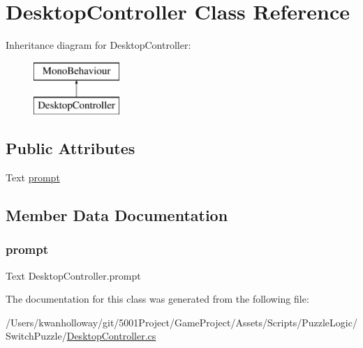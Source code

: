 \hypertarget{class_desktop_controller}{}\section{Desktop\+Controller Class Reference}
\label{class_desktop_controller}
Inheritance diagram for Desktop\+Controller\+:\begin{figure}[H]
\begin{center}
\leavevmode
\includegraphics[height=2.000000cm]{class_desktop_controller}
\end{center}
\end{figure}
\subsection*{Public Attributes}
\begin{DoxyCompactItemize}
\item 
Text \hyperlink{class_desktop_controller_a838c18cc5a44e5fb6e1489a390b2c8dd}{prompt}
\end{DoxyCompactItemize}


\subsection{Member Data Documentation}
\mbox{\label{class_desktop_controller_a838c18cc5a44e5fb6e1489a390b2c8dd}} 
\subsubsection{\texorpdfstring{prompt}{prompt}}
{\footnotesize\ttfamily Text Desktop\+Controller.\+prompt}



The documentation for this class was generated from the following file\+:\begin{DoxyCompactItemize}
\item 
/\+Users/kwanholloway/git/5001\+Project/\+Game\+Project/\+Assets/\+Scripts/\+Puzzle\+Logic/\+Switch\+Puzzle/\hyperlink{_desktop_controller_8cs}{Desktop\+Controller.\+cs}\end{DoxyCompactItemize}
